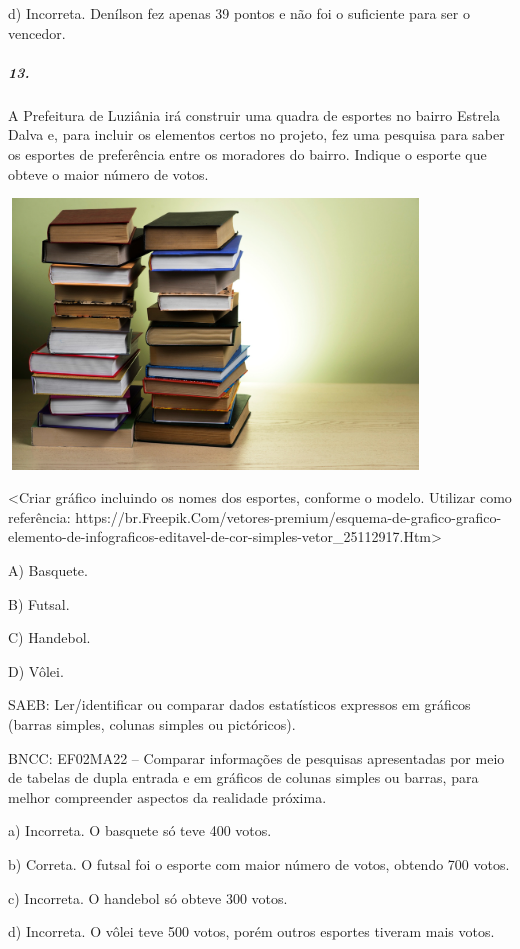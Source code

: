 d) Incorreta. Denílson fez apenas 39 pontos e não foi o suficiente para ser o vencedor.

\subparagraph{13. }\label{section-112}

A Prefeitura de Luziânia irá construir uma quadra de esportes no bairro
Estrela Dalva e, para incluir os elementos certos no projeto, fez uma
pesquisa para saber os esportes de preferência entre os moradores
do bairro. Indique o esporte que obteve o maior número de votos.

\includegraphics[width=4.32292in,height=2.82791in]{media/image123.png}

\textless{}Criar gráfico incluindo os nomes dos esportes, conforme o
modelo. Utilizar como referência:
https://br.Freepik.Com/vetores-premium/esquema-de-grafico-grafico-elemento-de-infograficos-editavel-de-cor-simples-vetor\_25112917.Htm\textgreater{}

A) Basquete.

B) Futsal.

C) Handebol.

D) Vôlei.

SAEB: Ler/identificar ou comparar dados estatísticos expressos
em gráficos (barras simples, colunas simples ou pictóricos).

BNCC: EF02MA22 -- Comparar informações de pesquisas apresentadas por meio
de tabelas de dupla entrada e em gráficos de colunas simples ou barras,
para melhor compreender aspectos da realidade próxima.

a) Incorreta. O basquete só teve 400 votos.

b) Correta. O futsal foi o esporte com maior número de votos, obtendo 700 votos.

c) Incorreta. O handebol só obteve 300 votos.

d) Incorreta. O vôlei teve 500 votos, porém outros esportes tiveram mais votos.


